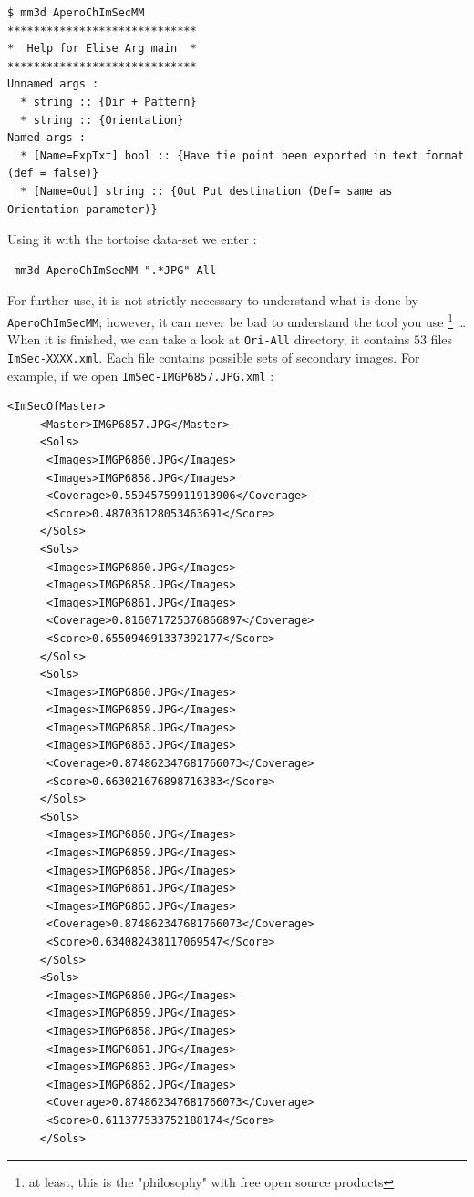 \begin{verbatim}
$ mm3d AperoChImSecMM
*****************************
*  Help for Elise Arg main  *
*****************************
Unnamed args :
  * string :: {Dir + Pattern}
  * string :: {Orientation}
Named args :
  * [Name=ExpTxt] bool :: {Have tie point been exported in text format (def = false)}
  * [Name=Out] string :: {Out Put destination (Def= same as Orientation-parameter)}
\end{verbatim}

Using it with the tortoise data-set we enter :

\begin{verbatim}
 mm3d AperoChImSecMM ".*JPG" All
\end{verbatim}

For further use, it is not strictly necessary to understand what is done
 by {\tt AperoChImSecMM}; however, it  can never be bad to understand the tool you use
\footnote{at least, this is the "philosophy" with free open source products} \dots
When it is finished, we can take a look at  {\tt Ori-All} directory, it
contains $53$ files  {\tt ImSec-XXXX.xml}. Each file contains possible sets of secondary images.
For example, if we open {\tt ImSec-IMGP6857.JPG.xml}  :

{\small
\begin{verbatim}
<ImSecOfMaster>
     <Master>IMGP6857.JPG</Master>
     <Sols>
	  <Images>IMGP6860.JPG</Images>
	  <Images>IMGP6858.JPG</Images>
	  <Coverage>0.55945759911913906</Coverage>
	  <Score>0.487036128053463691</Score>
     </Sols>
     <Sols>
	  <Images>IMGP6860.JPG</Images>
	  <Images>IMGP6858.JPG</Images>
	  <Images>IMGP6861.JPG</Images>
	  <Coverage>0.816071725376866897</Coverage>
	  <Score>0.655094691337392177</Score>
     </Sols>
     <Sols>
	  <Images>IMGP6860.JPG</Images>
	  <Images>IMGP6859.JPG</Images>
	  <Images>IMGP6858.JPG</Images>
	  <Images>IMGP6863.JPG</Images>
	  <Coverage>0.874862347681766073</Coverage>
	  <Score>0.663021676898716383</Score>
     </Sols>
     <Sols>
	  <Images>IMGP6860.JPG</Images>
	  <Images>IMGP6859.JPG</Images>
	  <Images>IMGP6858.JPG</Images>
	  <Images>IMGP6861.JPG</Images>
	  <Images>IMGP6863.JPG</Images>
	  <Coverage>0.874862347681766073</Coverage>
	  <Score>0.634082438117069547</Score>
     </Sols>
     <Sols>
	  <Images>IMGP6860.JPG</Images>
	  <Images>IMGP6859.JPG</Images>
	  <Images>IMGP6858.JPG</Images>
	  <Images>IMGP6861.JPG</Images>
	  <Images>IMGP6863.JPG</Images>
	  <Images>IMGP6862.JPG</Images>
	  <Coverage>0.874862347681766073</Coverage>
	  <Score>0.611377533752188174</Score>
     </Sols>
\end{verbatim}
}

